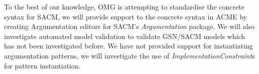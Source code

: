 To the best of our knowledge, OMG is attempting to standardise the concrete syntax for SACM, we will provide support to the concrete syntax in ACME by creating Argumentation editors for SACM's \textit{Argumentation} package. 
We will also investigate automated model validation to validate GSN/SACM models which has not been investigated before. We have not provided support for instantiating argumentation patterns, we will investigate the use of \textit{ImplementationConstraint}s for pattern instantiation.